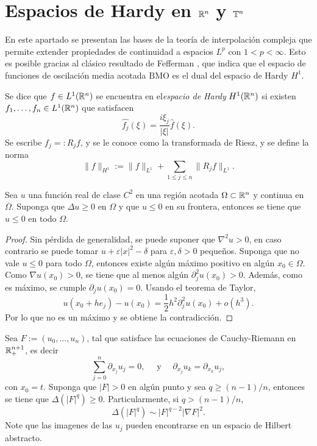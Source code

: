 \section{Espacios de Hardy en $\mathbb{R}^n$ y $\mathbb{T}^n$}
En este apartado se presentan las bases de la teoría de interpolación compleja que permite extender propiedades de continuidad a espacios $L^p$ con $1<p<\infty$. Esto es posible gracias al clásico resultado de Fefferman \cite{fefferman-BMO}, que indica que el espacio de funciones de oscilación media acotada $\mathrm{BMO}$ es el dual del espacio de Hardy $H^1$. 
\begin{definition}
	Se dice que $f\in L^1(\mathbb{R}^n)$ se encuentra en el\textit{espacio de Hardy} $H^1(\mathbb{R}^n)$ si existen $f_1,\ldots,f_n\in L^1(\mathbb{R}^n)$ que satisfacen
	\begin{equation*}
		\widehat{f_j} (\xi)= \frac{i\xi_j}{|\xi|}\widehat{f}(\xi).
	\end{equation*}
	Se escribe $f_j=:R_jf$, y se le conoce como la transformada de Riesz, y se define la norma 
	\begin{equation*}
		\|f\|_{H^1} := \|f\|_{L^1} + \sum_{1\leq j\leq n} \|R_jf\|_{L^1}.
	\end{equation*}
\end{definition}
\begin{proposition}
	Sea $u$ una función real de clase $C^2$ en una región acotada $\Omega\subset\mathbb{R}^n$ y continua en $\overline{\Omega}$. Suponga que $\Delta u \geq 0$ en $\Omega$ y que $u\leq0$ en su frontera, entonces se tiene que $u\leq 0$ en todo $\Omega$. 
\end{proposition}
\begin{proof}
	Sin pérdida de generalidad, se puede suponer que $\nabla^2 u > 0$, en caso contrario se puede tomar $u+\varepsilon|x|^2 - \delta$ para $\varepsilon,\delta>0$ pequeños. Suponga que no vale $u\leq 0$ para todo $\Omega$, entonces existe algún máximo positivo en algún $x_0\in\Omega$. Como $\nabla u(x_0) >0$, se tiene que al menos algún $\partial^2_j u(x_0) > 0$. Además, como es máximo, se cumple $\partial_j u(x_0) = 0$. Usando el teorema de Taylor,
	\begin{equation*}
		u(x_0+he_j) - u(x_0) = \frac{1}{2} h^2\partial^2_j u(x_0) + o(h^3).
	\end{equation*}
	Por lo que no es un máximo y se obtiene la contradicción.
\end{proof}
\begin{lemma}\label{lem:subharmonic-gradient}
	Sea $F:=(u_0,\ldots,u_n)$, tal que satisface las ecuaciones de Cauchy-Riemann en $\mathbb{R}^{n+1}_+$, es decir 
	\begin{equation*}
		\sum_{j=0}^n \partial_{x_j}u_j = 0, \quad \text{ y } \quad \partial_{x_j}u_k = \partial_{x_k}u_j,
	\end{equation*}
	con $x_0=t$.  Suponga que $|F|>0$ en algún punto y sea $q\geq(n-1)/n$, entonces se tiene que $\Delta(|F|^q) \geq 0$. Particularmente, si $q>(n-1)/n$, 
	\begin{equation*}
		\Delta(|F|^q) \sim |F|^{q-2}|\nabla F|^2.
	\end{equation*}
	Note que las imagenes de las $u_j$ pueden encontrarse en un espacio de Hilbert abstracto.
\end{lemma}
